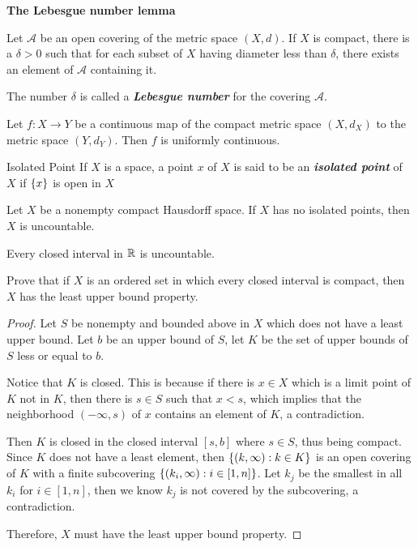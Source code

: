 \documentclass[12pt,a4paper]{article}
\begin{document}
    \begin{lemma}\textbf{The Lebesgue number lemma}\hfill
    
        Let $\mathcal{A}$ be an open covering of the metric space $(X,d)$. If $X$ is compact, there is a $\delta>0$ such that for each subset of $X$ having diameter less than $\delta$, there exists an element of $\mathcal{A}$ containing it.
    \end{lemma}
    \begin{remark}
        The number $\delta$ is called a \textbf{\textit{Lebesgue number}} for the covering $\mathcal{A}$.
    \end{remark}
    \hfill

    \begin{thm}
        Let $f:X\to Y$ be a continuous map of the compact metric space $(X,d_X)$ to the metric space $(Y,d_Y)$. Then $f$ is uniformly continuous.
    \end{thm}
    \hfill

    \begin{defi}{Isolated Point}
        If $X$ is a space, a point $x$ of $X$ is said to be an \textit{\textbf{isolated point}} of $X$ if $\left\{x\right\}$ is open in $X$
    \end{defi}
    \hfill

    \begin{thm}
        Let $X$ be a nonempty compact Hausdorff space. If $X$ has no isolated points, then $X$ is uncountable.
    \end{thm}
    \begin{cor}
        Every closed interval in $\mathbb{R}$ is uncountable.
    \end{cor}
    \hfill

    \begin{ex}
        Prove that if $X$ is an ordered set in which every closed interval is compact, then $X$ has the least upper bound property.
    \end{ex}
    \begin{proof}
        Let $S$ be nonempty and bounded above in $X$ which does not have a least upper bound. Let $b$ be an upper bound of $S$, let $K$ be the set of upper bounds of $S$ less or equal to $b$.
        
        Notice that $K$ is closed. This is because if there is $x\in X$ which is a limit point of $K$ not in $K$, then there is $s\in S$ such that $x<s$, which implies that the neighborhood $(-\infty,s)$ of $x$ contains an element of $K$, a contradiction.

        Then $K$ is closed in the closed interval $[s,b]$ where $s\in S$, thus being compact. Since $K$ does not have a least element, then $\left\{(k,\infty):k\in K\right\}$ is an open covering of $K$ with a finite subcovering $\left\{(k_i,\infty):i\in[1,n]\right\}$. Let $k_j$ be the smallest in all $k_i$ for $i\in[1,n]$, then we know $k_j$ is not covered by the subcovering, a contradiction.

        Therefore, $X$ must have the least upper bound property.
    \end{proof}
    \hfill
\end{document}
